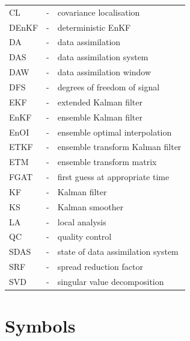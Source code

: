 \documentclass[11pt]{report}
\begin{document}
\begin{tabular}{lll}
  CL &-& covariance localisation \\
  DEnKF &-& deterministic EnKF \\
  DA &-& data assimilation \\
  DAS &-& data assimilation system \\
  DAW &-& data assimilation window \\
  DFS &-& degrees of freedom of signal \\
  EKF &-& extended Kalman filter \\
  EnKF &-& ensemble Kalman filter \\
  EnOI &-& ensemble optimal interpolation \\
  ETKF &-& ensemble transform Kalman filter \\
  ETM &-& ensemble transform matrix \\
  FGAT &-& first guess at appropriate time \\
  KF &-& Kalman filter \\
  KS &-& Kalman smoother \\
  LA &-& local analysis \\
  QC &-& quality control \\
  SDAS &-& state of data assimilation system \\
  SRF &-& spread reduction factor \\
  SVD &-& singular value decomposition \\
\end{tabular}

\clearpage

\chapter*{Symbols}
\end{document}
